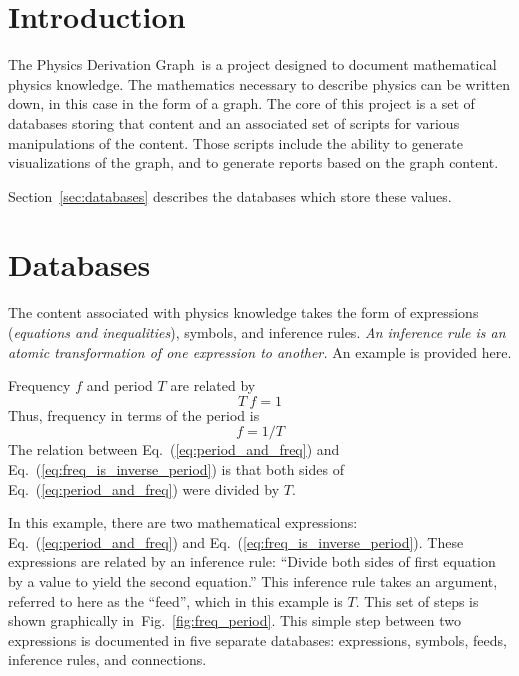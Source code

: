 \documentclass{article}
\newcommand{\eqn}[1]{Eq.\ (\ref{#1})}
\newcommand{\pdg}{Physics Derivation Graph}
\begin{document}
\begin{multicols}{2}



\section{Introduction}

The \pdg\ is a project designed to document mathematical physics knowledge. The mathematics necessary to describe physics can be written down, in this case in the form of a graph. The core of this project is a set of databases storing that content and an associated set of scripts for various manipulations of the content. Those scripts include the ability to generate visualizations of the graph, and to generate reports based on the graph content.

Section~\ref{sec:databases} describes the databases which store these values. 

\section{Databases\label{sec:databases}}

The content associated with physics knowledge takes the form of expressions (\textit{equations and inequalities}), symbols, and inference rules. \textit{An inference rule is an atomic transformation of one expression to another.} An example is provided here. 

Frequency $f$ and period $T$ are related by
\begin{equation}
T\ f = 1
\label{eq:period_and_freq}
\end{equation}
Thus, frequency in terms of the period is
\begin{equation}
f = 1/T
\label{eq:freq_is_inverse_period}
\end{equation}
The relation between \eqn{eq:period_and_freq} and \eqn{eq:freq_is_inverse_period} is that both sides of \eqn{eq:period_and_freq} were divided by $T$. 

In this example, there are two mathematical expressions: \eqn{eq:period_and_freq} and \eqn{eq:freq_is_inverse_period}. These expressions are related by an inference rule: ``Divide both sides of first equation by a value to yield the second equation.'' This inference rule takes an argument, referred to here as the ``feed'', which in this example is $T$. This set of steps is shown graphically in~Fig.~\ref{fig:freq_period}. This simple step between two expressions is documented in five separate databases: expressions, symbols, feeds, inference rules, and connections. 


\end{multicols}
\end{document}
